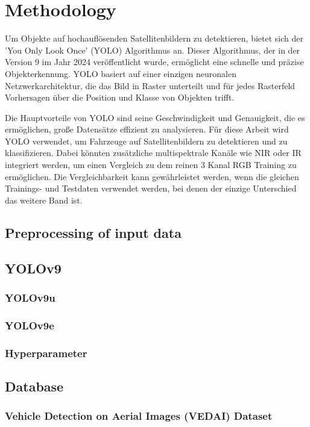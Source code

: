 \chapter{Methodology}
\label{ch:methodology}

\ifimportant

Um Objekte auf hochauflösenden Satellitenbildern zu detektieren, bietet sich der 'You Only Look Once' (YOLO) Algorithmus an. Dieser Algorithmus, der in der Version 9 im Jahr 2024 veröffentlicht wurde, ermöglicht eine schnelle und präzise Objekterkennung. YOLO basiert auf einer einzigen neuronalen Netzwerkarchitektur, die das Bild in Raster unterteilt und für jedes Rasterfeld Vorhersagen über die Position und Klasse von Objekten trifft. 

Die Hauptvorteile von YOLO sind seine Geschwindigkeit und Genauigkeit, die es ermöglichen, große Datensätze effizient zu analysieren. Für diese Arbeit wird YOLO verwendet, um Fahrzeuge auf Satellitenbildern zu detektieren und zu klassifizieren. Dabei könnten zusätzliche multispektrale Kanäle wie NIR oder IR integriert werden, um einen Vergleich zu dem reinen 3 Kanal RGB Training zu ermöglichen. Die Vergleichbarkeit kann gewährleistet werden, wenn die gleichen Trainings- und Testdaten verwendet werden, bei denen der einzige Unterschied das weitere Band ist.

\section{Preprocessing of input data}
\section{YOLOv9}
\subsection{YOLOv9u}
\subsection{YOLOv9e}
\subsection{Hyperparameter}

\section{Database}
\subsection{Vehicle Detection on Aerial Images (VEDAI) Dataset}

